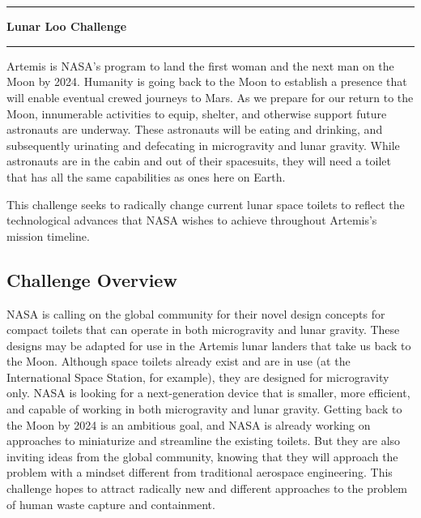 \pagebreak
\chapter[Lunar Loo Challenge]{}\vspace{-2cm}\noindent\rule{\textwidth}{2.5pt}
\thispagestyle{empty}

\vspace{5cm}\textbf{\huge{Lunar Loo Challenge}}

\medskip\noindent\rule{\textwidth}{1pt}

Artemis is NASA’s program to land the first woman and the next man on the Moon by 2024.  Humanity is going back to the Moon to establish a presence that will enable eventual crewed journeys to Mars.  As we prepare for our return to the Moon, innumerable activities to equip, shelter, and otherwise support future astronauts are underway.  These astronauts will be eating and drinking, and subsequently urinating and defecating in microgravity and lunar gravity.  While astronauts are in the cabin and out of their spacesuits, they will need a toilet that has all the same capabilities as ones here on Earth.  

This challenge seeks to radically change current lunar space toilets to reflect the technological advances that NASA wishes to achieve throughout Artemis's mission timeline.

\pagebreak

\section{Challenge Overview}
NASA is calling on the global community for their novel design concepts for compact toilets that can operate in both microgravity and lunar gravity.  These designs may be adapted for use in the Artemis lunar landers that take us back to the Moon.  Although space toilets already exist and are in use (at the International Space Station, for example), they are designed for microgravity only.  NASA is looking for a next-generation device that is smaller, more efficient, and capable of working in both microgravity and lunar gravity.  Getting back to the Moon by 2024 is an ambitious goal, and NASA is already working on approaches to miniaturize and streamline the existing toilets.  But they are also inviting ideas from the global community, knowing that they will approach the problem with a mindset different from traditional aerospace engineering.  This challenge hopes to attract radically new and different approaches to the problem of human waste capture and containment.

